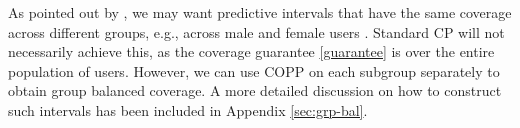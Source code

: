\begin{importantresultwithtitle}[title=Towards group balanced coverage]\noindent \label{sec:group_balanced_cov}

As pointed out by \cite{conf-bates}, we may want predictive intervals that have the same coverage across different groups, e.g., across male and female users \citep{Romano2020With}. Standard CP will not necessarily achieve this, as the coverage guarantee \eqref{guarantee} is over the entire population of users.
However, we can use COPP on each subgroup separately to obtain group balanced coverage. A more detailed discussion on how to construct such intervals has been included in Appendix \ref{sec:grp-bal}.
\end{importantresultwithtitle}


